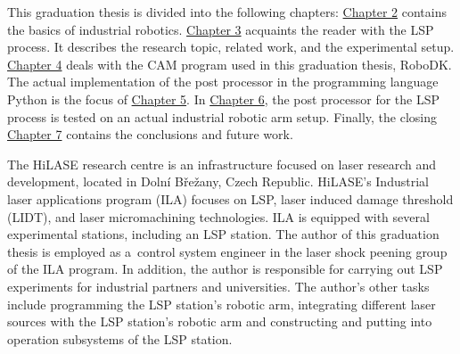 This graduation thesis is divided into the following chapters: \hyperref[chap:basics]{Chapter 2} contains the basics of industrial robotics. \hyperref[chap:peening]{Chapter 3} acquaints the reader with the LSP process.  It describes the research topic, related work, and the experimental setup.  
\hyperref[chap:design]{Chapter 4} deals with the CAM program used in this graduation thesis, RoboDK. The actual implementation of the post processor in the programming language Python is the focus of \hyperref[chap:implementation]{Chapter 5}. In \hyperref[chap:testing]{Chapter 6}, the post processor for the LSP process is tested on an actual industrial robotic arm setup. Finally, the closing \hyperref[chap:discussion]{Chapter 7} contains the conclusions and future work. 

The HiLASE research centre is an infrastructure focused on laser research and development, located in Dolní Břežany, Czech Republic. HiLASE's Industrial laser applications program (ILA) focuses on LSP, laser induced damage threshold (LIDT), and laser micromachining technologies. ILA is equipped with several experimental stations, including an LSP station. The author of this graduation thesis is employed as a~control system engineer in the laser shock peening group of the ILA program. In addition, the author is responsible for carrying out LSP experiments for industrial partners and universities. The author's other tasks include programming the LSP station's robotic arm, integrating different laser sources with the  LSP station's robotic arm and constructing and putting into operation subsystems of the LSP station.




